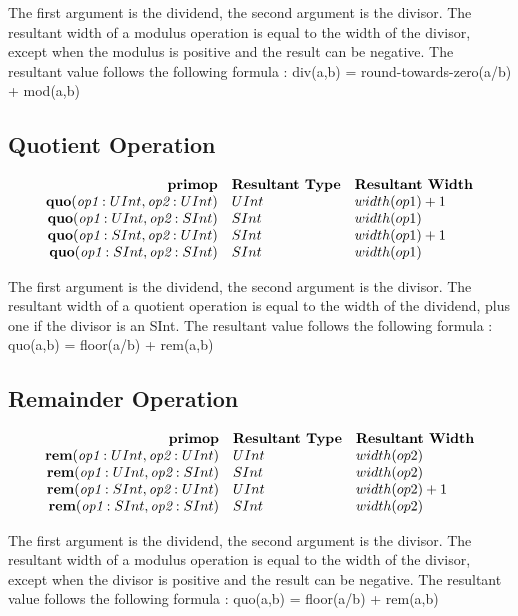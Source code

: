 \documentclass[10pt]{article}
\begin{document}
The first argument is the dividend, the second argument is the divisor.
The resultant width of a modulus operation is equal to the width of the divisor, except when the modulus is positive and the result can be negative.
The resultant value follows the following formula : div(a,b) = round-towards-zero(a/b) + mod(a,b)

\subsection{Quotient Operation}
\[
\begin{array}{rll}
\text{\bf primop} & \text{\bf Resultant Type} & \text{\bf Resultant Width} \\
\text{\bf quo}(\text{\em op1}:UInt, \text{\em op2}:UInt) &   UInt & width(op1) + 1 \\
\text{\bf quo}(\text{\em op1}:UInt, \text{\em op2}:SInt) &   SInt & width(op1)     \\
\text{\bf quo}(\text{\em op1}:SInt, \text{\em op2}:UInt) &   SInt & width(op1) + 1 \\
\text{\bf quo}(\text{\em op1}:SInt, \text{\em op2}:SInt) &   SInt & width(op1)     \\
\end{array}
\]

The first argument is the dividend, the second argument is the divisor.
The resultant width of a quotient operation is equal to the width of the dividend, plus one if the divisor is an SInt.
The resultant value follows the following formula : quo(a,b) = floor(a/b) + rem(a,b)

\subsection{Remainder Operation}
\[
\begin{array}{rll}
\text{\bf primop} & \text{\bf Resultant Type} & \text{\bf Resultant Width} \\
\text{\bf rem}(\text{\em op1}:UInt, \text{\em op2}:UInt) &   UInt & width(op2)     \\
\text{\bf rem}(\text{\em op1}:UInt, \text{\em op2}:SInt) &   SInt & width(op2)     \\
\text{\bf rem}(\text{\em op1}:SInt, \text{\em op2}:UInt) &   UInt & width(op2) + 1 \\
\text{\bf rem}(\text{\em op1}:SInt, \text{\em op2}:SInt) &   SInt & width(op2)     \\
\end{array}
\]

The first argument is the dividend, the second argument is the divisor.
The resultant width of a modulus operation is equal to the width of the divisor, except when the divisor is positive and the result can be negative.
The resultant value follows the following formula : quo(a,b) = floor(a/b) + rem(a,b)
\end{document}
